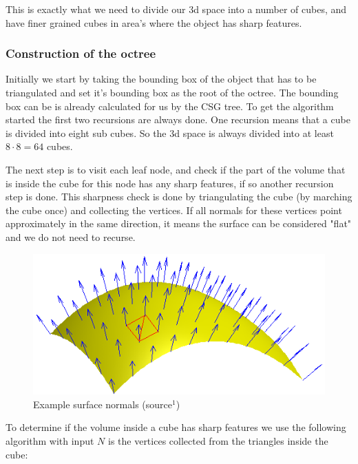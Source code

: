 \documentclass[a4paper,10pt,twocolumn]{article}
\begin{document}
This is exactly what we need to divide our 3d space into a number of cubes, and have finer grained cubes in area's where the object has sharp features.

\subsubsection{Construction of the octree}
\label{sect:genoctree}
Initially we start by taking the bounding box of the object that has to be triangulated and set it's bounding box as the root of the octree. The bounding box can be is already calculated for us by the CSG tree. To get the algorithm started the first two recursions are always done. One recursion means that a cube is divided into eight sub cubes. So the 3d space is always divided into at least $8 \cdot 8 = 64$ cubes.

The next step is to visit each leaf node, and check if the part of the volume that is inside the cube for this node has any sharp features, if so another recursion step is done. This sharpness check is done by triangulating the cube (by marching the cube once) and collecting the vertices. If all normals for these vertices point approximately in the same direction, it means the surface can be considered "flat" and we do not need to recurse.

    \begin{figure}[h]
        \begin{center}
            \includegraphics[scale=0.4]{./images/Surface_normal}
        \end{center}
        \caption{Example surface normals (source$^1$)}
        \label{figure:surface_normal}
    \end{figure}

To determine if the volume inside a cube has sharp features we use the following algorithm with input $N$ is the vertices collected from the triangles inside the cube:
\end{document}
